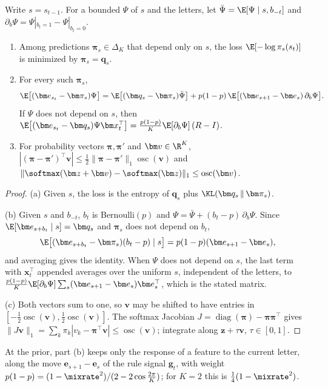 \begin{lemma}
\label{lem:R-identity}
Write $s=s_{t-1}$. For a bounded $\Psi$ of $s$ and the letters, let $\bar\Psi=\E[\Psi\mid s,b_{-t}]$ and
$\partial_b\Psi=\Psi|_{b_t=1}-\Psi|_{b_t=0}$.
\begin{enumerate}[label=(\alph*),leftmargin=*,itemsep=3pt,topsep=2pt]
\item Among predictions $\bm\pi_s\in\Delta_K$ that depend only on $s$, the loss $\E[-\log\pi_{s}(s_t)]$ is minimized by $\bm\pi_s=\bm q_s$.
\item For every such $\bm\pi_s$,
\[
 \E\bigl[(\bm e_{s_t}-\bm\pi_s)\Psi\bigr]=\E\bigl[(\bm q_s-\bm\pi_s)\bar\Psi\bigr]+p(1-p)\,\E\bigl[(\bm e_{s+1}-\bm e_s)\,\partial_b\Psi\bigr].
\]
If $\Psi$ does not depend on $s$, then
$\E\bigl[(\bm e_{s_t}-\bm q_s)\Psi\bm x_t^\top\bigr]=\tfrac{p(1-p)}K\E[\partial_b\Psi]\,(R-I)$.
\item For probability vectors $\bm\pi,\bm\pi'$ and $\bm v\in\R^K$, $|(\bm\pi-\bm\pi')^\top\bm v|\le\tfrac12\|\bm\pi-\bm\pi'\|_1\operatorname{osc}(\bm v)$
and $\|\softmax(\bm z+\bm v)-\softmax(\bm z)\|_1\le\operatorname{osc}(\bm v)$.
\end{enumerate}
\end{lemma}

\begin{proof}
(a) Given $s$, the loss is the entropy of $\bm q_s$ plus $\KL(\bm q_s\,\|\,\bm\pi_s)$.

(b) Given $s$ and $b_{-t}$, $b_t$ is Bernoulli$(p)$ and $\Psi=\bar\Psi+(b_t-p)\,\partial_b\Psi$. Since $\E[\bm e_{s+b_t}\mid s]=\bm q_s$ and
$\bm\pi_s$ does not depend on $b_t$,
\[
 \E\bigl[(\bm e_{s+b_t}-\bm\pi_s)(b_t-p)\mid s\bigr]=p(1-p)(\bm e_{s+1}-\bm e_s),
\]
and averaging gives the identity. When $\Psi$ does not depend on $s$, the last term with $\bm x_t^\top$ appended averages over the
uniform $s$, independent of the letters, to $\tfrac{p(1-p)}K\E[\partial_b\Psi]\sum_s(\bm e_{s+1}-\bm e_s)\bm e_s^\top$, which is the stated matrix.

(c) Both vectors sum to one, so $\bm v$ may be shifted to have entries in $[-\tfrac12\operatorname{osc}(\bm v),\tfrac12\operatorname{osc}(\bm v)]$.
The softmax Jacobian $J=\operatorname{diag}(\bm\pi)-\bm\pi\bm\pi^\top$ gives $\|J\bm v\|_1=\sum_k\pi_k|v_k-\bm\pi^\top\bm v|\le\operatorname{osc}(\bm v)$;
integrate along $\bm z+\tau\bm v$, $\tau\in[0,1]$.
\end{proof}

At the prior, part (b) keeps only the response of a feature to the current letter, along the move $\bm e_{s+1}-\bm e_s$ of the rule
signal $\bm g_t$, with weight $p(1-p)=(1-\mixrate^2)/(2-2\cos\tfrac{2\pi}K)$; for $K=2$ this is $\tfrac14(1-\mixrate^2)$.

